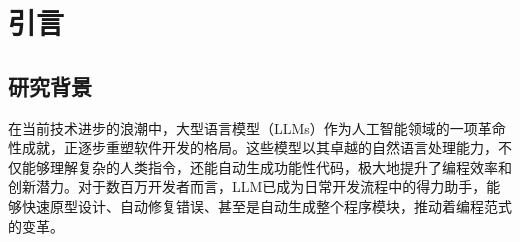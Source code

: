 \documentclass{article} %
\begin{document}
\begin{abstract}

本研究课题聚焦于大型语言模型（LLMs）在恶意编程中的应用与防护，针对其在提升编程效率与创新潜力的同时所带来的潜在安全风险进行深入探讨。随着LLMs在软件开发领域的广泛应用，其依赖的海量互联网数据源中混杂的恶意代码片段，如安全漏洞、后门植入等，成为模型传授不良编程行为的隐患。通过精心构造的对抗性提示，攻击者能诱导LLMs生成含有恶意内容的文本或代码，揭示了模型在对抗性攻击面前的脆弱性。此外，微调技术与中毒攻击进一步暴露了模型生成特定安全漏洞代码的可能性，甚至使其成为渗透测试工具。

研究面临的主要挑战包括设计既保持自然性又能规避模型防御机制的高质量对抗性提示，以及建立客观评估模型应答质量的标准与自动化系统，以确保防护机制的有效性。为了提升模型的自我审查能力，研究倡导跨学科合作，结合算法创新、法律、伦理学和安全工程等多个维度，推动AI辅助编程的健康发展。

论文详细介绍了大语言模型的原理，从One-Hot、Word2Vec、GloVe到更复杂的模型，展示了语言模型发展的历程。同时，研究揭示了对抗性攻击的多种方式，如Base64编码注入、多样本越狱攻击等，以及它们如何通过策略创新绕过模型的安全机制。通过综合分析，论文强调了对抗性Prompt设计与模型响应质量评估的重要性，并提出了未来研究方向，包括智能化Prompt生成算法、跨领域知识融合、动态防御机制、伦理法律框架完善以及国际协作，以期在确保AI技术安全可靠的基础上，促进其健康可持续发展。

\vspace*{70pt}

\noindent\textbf{关键词：}大语言模型\space\space\space\space  对抗性攻击\space\space\space\space Prompt生成\space\space\space\space 评估指标\space\space\space\space 安全防护


\end{abstract}

\newpage

\tableofcontents
\newpage



\section{引言}
\subsection{研究背景}
在当前技术进步的浪潮中，大型语言模型（LLMs）作为人工智能领域的一项革命性成就，正逐步重塑软件开发的格局。这些模型以其卓越的自然语言处理能力，不仅能够理解复杂的人类指令，还能自动生成功能性代码，极大地提升了编程效率和创新潜力。对于数百万开发者而言，LLM已成为日常开发流程中的得力助手，能够快速原型设计、自动修复错误、甚至是自动生成整个程序模块，推动着编程范式的变革。
\end{document}
